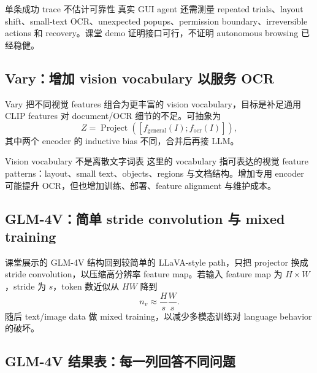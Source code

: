 \begin{warningbox}{单条成功 trace 不估计可靠性}
真实 GUI agent 还需测量 repeated trials、layout shift、small-text OCR、unexpected popups、permission boundary、irreversible actions 和 recovery。课堂 demo 证明接口可行，不证明 autonomous browsing 已经稳健。
\end{warningbox}

\subsection{Vary：增加 vision vocabulary 以服务 OCR}

Vary 把不同视觉 features 组合为更丰富的 vision vocabulary，目标是补足通用 CLIP features 对 document/OCR 细节的不足。可抽象为
\[
Z=\operatorname{Project}\!\left([f_{\text{general}}(I);f_{\text{ocr}}(I)]\right),
\]
其中两个 encoder 的 inductive bias 不同，合并后再接 LLM。


\begin{knowledgebox}{Vision vocabulary 不是离散文字词表}
这里的 vocabulary 指可表达的视觉 feature patterns：layout、small text、objects、regions 与文档结构。增加专用 encoder 可能提升 OCR，但也增加训练、部署、feature alignment 与维护成本。
\end{knowledgebox}

\subsection{GLM-4V：简单 stride convolution 与 mixed training}

课堂展示的 GLM-4V 结构回到较简单的 LLaVA-style path，只把 projector 换成 stride convolution，以压缩高分辨率 feature map。若输入 feature map 为 $H\times W$，stride 为 $s$，token 数近似从 $HW$ 降到
\[
n_v\approx \frac{H}{s}\frac{W}{s}.
\]
随后 text/image data 做 mixed training，以减少多模态训练对 language behavior 的破坏。



\subsection{GLM-4V 结果表：每一列回答不同问题}

